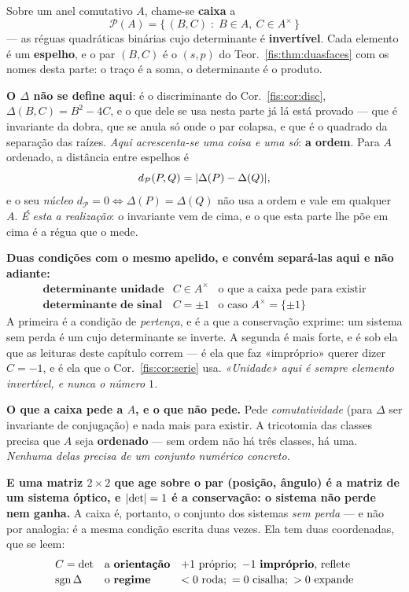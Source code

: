 \documentclass[livro.tex]{subfiles}
\begin{document}
\begin{definicao}\label{fis:def:caixa}
Sobre um anel comutativo $A$, chame-se \textbf{caixa} a
\[
\mathcal{P}(A)=\bigl\{\,(B,C)\;:\;B\in A,\ C\in A^{\times}\,\bigr\}
\]
--- as réguas quadráticas binárias cujo determinante é \textbf{invertível}. Cada
elemento é um \textbf{espelho}, e o par $(B,C)$ é o $(s,p)$ do
Teor.~\ref{fis:thm:duasfaces} com os nomes desta parte: o traço é a soma, o
determinante é o produto.

\medskip\noindent\textbf{O $\Delta$ não se define aqui}: é o discriminante do
Cor.~\ref{fis:cor:disc}, $\Delta(B,C)=B^{2}-4C$, e o que dele se usa nesta parte
já lá está provado --- que é invariante da dobra, que se anula só onde o par
colapsa, e que é o quadrado da separação das raízes. \emph{Aqui acrescenta-se uma
coisa e uma só}: \textbf{a ordem}. Para $A$ ordenado, a distância entre espelhos
é
\[
d_{\mathcal{P}}(P,Q)=\lvert \Delta(P)-\Delta(Q)\rvert ,
\]
e o seu \emph{núcleo} $d_{\mathcal{P}}=0\iff\Delta(P)=\Delta(Q)$ não usa a ordem
e vale em qualquer $A$. \emph{É esta a realização}: o invariante vem de cima, e o
que esta parte lhe põe em cima é a régua que o mede.

\medskip\noindent\textbf{Duas condições com o mesmo apelido, e convém separá-las
aqui e não adiante:}
\[
\begin{array}{lll}
\textbf{determinante unidade} & C\in A^{\times} & \text{o que a caixa pede para existir}\\[2pt]
\textbf{determinante de sinal} & C=\pm1 & \text{o caso }A^{\times}=\{\pm1\}
\end{array}
\]
A primeira é a condição de \emph{pertença}, e é a que a conservação exprime: um
sistema sem perda é um cujo determinante se inverte. A segunda é mais forte, e é
sob ela que as leituras deste capítulo correm --- é ela que faz «impróprio»
querer dizer $C=-1$, e é ela que o Cor.~\ref{fis:cor:serie} usa. \emph{«Unidade»
aqui é sempre elemento invertível, e nunca o número $1$.}
\end{definicao}

\medskip\noindent\textbf{O que a caixa pede a $A$, e o que não pede.} Pede
\emph{comutatividade} (para $\Delta$ ser invariante de conjugação) e nada mais
para existir. A tricotomia das classes precisa que $A$ seja \textbf{ordenado} ---
sem ordem não há três classes, há uma. \emph{Nenhuma delas precisa de um conjunto
numérico concreto.}

\medskip\noindent\textbf{E uma matriz $2\times2$ que age sobre o par (posição,
ângulo) é a matriz de um sistema óptico, e $\lvert \det\rvert=1$ é a
\textbf{conservação}: o sistema não perde nem ganha.} A caixa é, portanto, o
conjunto dos sistemas \emph{sem perda} --- e não por analogia: é a mesma condição
escrita duas vezes. Ela tem duas coordenadas, que se leem:
\[
\begin{array}{lll}
C=\det & \text{a \textbf{orientação}} & +1\ \text{próprio};\ -1\ \text{\textbf{impróprio}, reflete}\\[2pt]
\operatorname{sgn}\Delta & \text{o \textbf{regime}} & <0\ \text{roda};\ =0\ \text{cisalha};\ >0\ \text{expande}
\end{array}
\]
\end{document}
